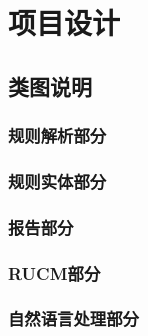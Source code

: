 \chapter{项目设计}

\section{类图说明}
    \subsection{规则解析部分}
    \subsection{规则实体部分}
    \subsection{报告部分}
    \subsection{RUCM部分}
    \subsection{自然语言处理部分}
